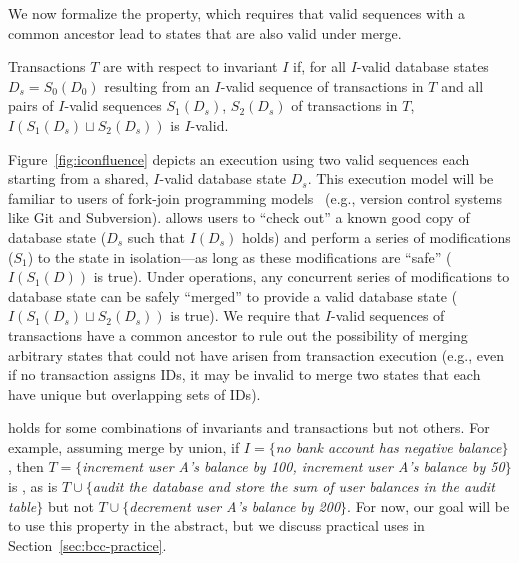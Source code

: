 We now formalize the \iconfluence property, which requires that valid
sequences with a common ancestor lead to states that are also valid
under merge.

\begin{definition}[\iconfluence]
Transactions $T$ are \iconfluent with respect to invariant $I$ if, for
all $I$-valid database states $D_s=S_0(D_0)$ resulting from an
$I$-valid sequence of transactions in $T$ and all pairs of $I$-valid
sequences $S_1(D_s)$, $S_2(D_s)$ of transactions in $T$, $I(S_1(D_s)
\sqcup S_2(D_s))$ is $I$-valid.
\end{definition}

Figure~\ref{fig:iconfluence} depicts an \iconfluent execution using
two valid sequences each starting from a shared, $I$-valid database
state $D_s$. This execution model will be familiar to users of
fork-join programming models~\cite{hewitt-forkjoin} (e.g., version
control systems like Git and Subversion). \iconfluence allows users to
``check out'' a known good copy of database state ($D_s$ such that
$I(D_s)$ holds) and perform a series of modifications ($S_1$) to the
state in isolation---as long as these modifications are ``safe''
($I(S_1(D))$ is true). Under \iconfluent operations, any concurrent
series of modifications to database state can be safely ``merged'' to
provide a valid database state ($I(S_1(D_s) \sqcup S_2(D_s))$ is
true). We require that $I$-valid sequences of transactions have a
common ancestor to rule out the possibility of merging arbitrary
states that could not have arisen from transaction execution (e.g.,
even if no transaction assigns IDs, it may be invalid to merge two
states that each have unique but overlapping sets of IDs).

\iconfluence holds for some combinations of invariants and
transactions but not others. For example, assuming merge by union, if
$I=\{$\textit{no bank account has negative balance}$\}$, then
$T=\{$\textit{increment user A's balance by 100, increment user A's
  balance by 50}$\}$ is \iconfluent, as is $T\cup\{$\textit{audit the
  database and store the sum of user balances in the \textrm{audit}
  table}$\}$ but not $T\cup\{$\textit{decrement user A's balance by
  200}$\}$. For now, our goal will be to use this property in the
abstract, but we discuss practical uses in
Section~\ref{sec:bcc-practice}.

